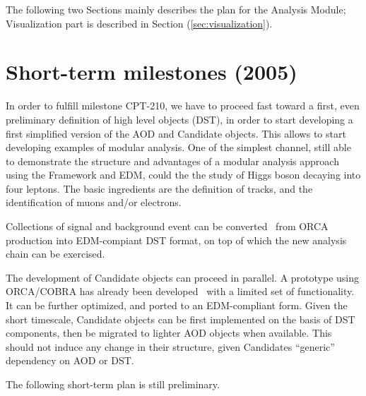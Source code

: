 \documentclass[draftmode]{memarticle}
\begin{document}
The following two Sections mainly describes the plan for 
the Analysis Module; Visualization part is described
in Section (\ref{sec:visualization}).

\section{Short-term milestones (2005)}
In order to fulfill milestone CPT-210, we have to proceed fast toward 
a first, even preliminary definition of high level objects (DST), 
in order to start developing a first simplified version of the AOD
and Candidate objects. This allows to start developing examples
of modular analysis. One of the simplest channel, still able to
demonstrate the structure and advantages of a modular analysis
approach using the Framework and EDM, could the the study of
Higgs boson decaying into four leptons. The basic ingredients
are the definition of tracks, and the identification of muons
and/or electrons.

Collections of signal and background event can be converted~\cite{converter} from 
ORCA production into EDM-compiant DST format, on top of which the
new analysis chain can be exercised.

The development of Candidate objects can proceed in parallel.
A prototype using ORCA/COBRA has already been developed~\cite{candroto} with
a limited set of functionality. It can be further optimized, and
ported to an EDM-compliant form. Given the short timescale, Candidate
objects can be first implemented on the basis of DST components, then be
migrated to lighter AOD objects when available. This should not induce 
any change in their structure, given Candidates ``generic'' dependency 
on AOD or DST.

The following short-term plan is still preliminary.
\renewcommand{\labelenumi}{\Roman{enumi}.}
\renewcommand{\labelenumii}{(\arabic{enumii})}
\renewcommand{\labelenumiii}{\arabic{enumiii}.}
\renewcommand{\labelenumiv}{\arabic{enumiii}.\arabic{enumiv}.}
\renewcommand{\theenumi}{\Roman{enumi}}
\renewcommand{\theenumii}{\arabic{enumii}}
\renewcommand{\theenumiii}{\arabic{enumiii}}
\renewcommand{\theenumiv}{.\arabic{enumiv}}
\end{document}
